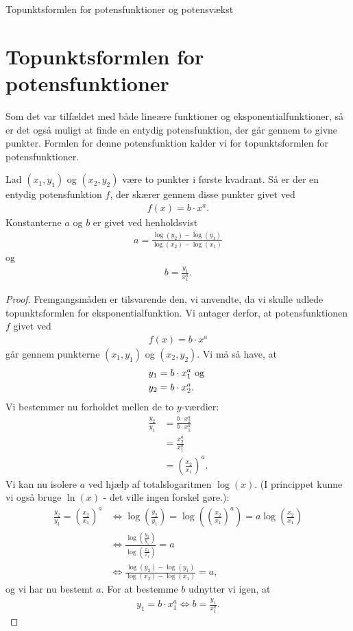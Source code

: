 
\begin{center}
\Huge
Topunktsformlen for potensfunktioner og potensvækst
\end{center}
\section*{Topunktsformlen for potensfunktioner}
Som det var tilfældet med både lineære funktioner og eksponentialfunktioner, så er det også muligt at finde en entydig potensfunktion, der går gennem to givne punkter. Formlen for denne potensfunktion kalder vi for topunktsformlen for potensfunktioner.
\begin{setn}
Lad $(x_1,y_1)$ og $(x_2,y_2)$ være to punkter i første kvadrant. Så er der en entydig potensfunktion $f$, der skærer gennem disse punkter givet ved
\begin{align*}
f(x) = b\cdot x^a.
\end{align*}
Konstanterne $a$ og $b$ er givet ved henholdsvist
\begin{align*}
a = \frac{\log(y_2)-\log(y_1)}{\log(x_2)-\log(x_1)}
\end{align*}
og
\begin{align*}
b = \frac{y_1}{x_1^{a}}.
\end{align*}
\end{setn}
\begin{proof}
Fremgangsmåden er tilsvarende den, vi anvendte, da vi skulle udlede topunktsformlen for eksponentialfunktion. Vi antager derfor, at potensfunktionen $f$ givet ved
\begin{align*}
f(x) = b\cdot x^a
\end{align*}
går gennem punkterne $(x_1,y_1)$ og $(x_2,y_2)$. Vi må så have, at 
\begin{align*}
y_1 &= b\cdot x_1^a \textnormal{ og }\\ y_2 &= b\cdot x_2^a.
\end{align*}
Vi bestemmer nu forholdet mellen de to $y$-værdier:
\begin{align*}
\frac{y_2}{y_1} &= \frac{b\cdot x_2^a}{b\cdot x_1^a}\\
&= \frac{x_2^a}{x_1^a}\\
&= \left(\frac{x_2}{x_1}\right)^a.
\end{align*}
Vi kan nu isolere $a$ ved hjælp af totalslogaritmen $\log(x)$. (I princippet kunne vi også bruge $\ln(x)$ - det ville ingen forskel gøre.):
\begin{align*}
\frac{y_2}{y_1} = \left(\frac{x_2}{x_1}\right)^a &\Leftrightarrow \log\left(\frac{y_2}{y_1}\right) = \log\left(\left(\frac{x_2}{x_1}\right)^a\right) = a\log\left(\frac{x_2}{x_1}\right)\\
&\Leftrightarrow \frac{\log\left(\frac{y_2}{y_1}\right)}{\log\left(\frac{x_2}{x_1}\right)} = a\\
&\Leftrightarrow \frac{\log(y_2)-\log(y_1)}{\log(x_2)-\log(x_1)} = a,
\end{align*}
og vi har nu bestemt $a$. 
For at bestemme $b$ udnytter vi igen, at 
\begin{align*}
y_1 = b\cdot x_1^a \Leftrightarrow b = \frac{y_1}{x_1^a}.
\end{align*} 
\end{proof}
